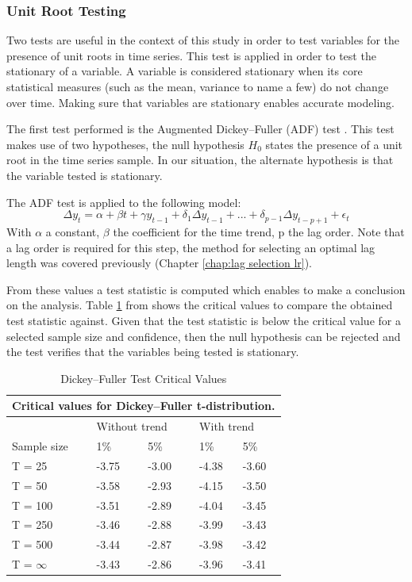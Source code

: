 \subsubsection{Unit Root Testing}

Two tests are useful in the context of this study in order to test variables for the presence of unit roots in time series. This test is applied in order to test the stationary of a variable. A variable is considered stationary when  its core statistical measures (such as the mean, variance to name a few) do not change over time. Making sure that variables are stationary enables accurate modeling.

The first test performed is the Augmented Dickey–Fuller (ADF) test \citep{fuller2009introduction}. This test makes use of two hypotheses, the null hypothesis $H_0$ states the presence of a unit root in the time series sample. In our situation, the alternate hypothesis is that the variable tested is stationary.

The ADF test is applied to the following model:
\begin{equation}
    \Delta y_{t} = \alpha + \beta t + \gamma y_{t-1} + \delta_{1}\Delta y_{t-1} + ... + \delta_{p-1}\Delta y_{t-p+1} + \epsilon_{t} 
\end{equation}
With $\alpha$ a constant, $\beta$ the coefficient for the time trend, p the lag order. Note that a lag order is required for this step, the method for selecting an optimal lag length was covered previously (Chapter \ref{chap:lag selection lr}).

From these values a test statistic is computed which enables to make a conclusion on the analysis. Table \ref{tab:adf values} from \cite{fuller2009introduction} shows the critical values to compare the obtained test statistic against. Given that the test statistic is below the critical value for a selected sample size and confidence, then the null hypothesis can be rejected and the test verifies that the variables being tested is stationary.

\begin{table}[H]
\centering
\begin{tabular}{@{}lllll@{}}
\toprule
\multicolumn{5}{c}{\textbf{Critical values for Dickey–Fuller t-distribution.}} \\ \midrule
 & \multicolumn{2}{l}{Without   trend} & \multicolumn{2}{l}{With trend} \\
Sample size & 1\% & 5\% & 1\% & 5\% \\ \midrule
T = 25 & -3.75 & -3.00 & -4.38 & -3.60 \\
T = 50 & -3.58 & -2.93 & -4.15 & -3.50 \\
T = 100 & -3.51 & -2.89 & -4.04 & -3.45 \\
T = 250 & -3.46 & -2.88 & -3.99 & -3.43 \\
T = 500 & -3.44 & -2.87 & -3.98 & -3.42 \\
T = $\infty$ & -3.43 & -2.86 & -3.96 & -3.41 \\ \bottomrule
\end{tabular}
\caption{Dickey–Fuller Test Critical Values \citep{fuller2009introduction}}
\label{tab:adf values}
\end{table}

